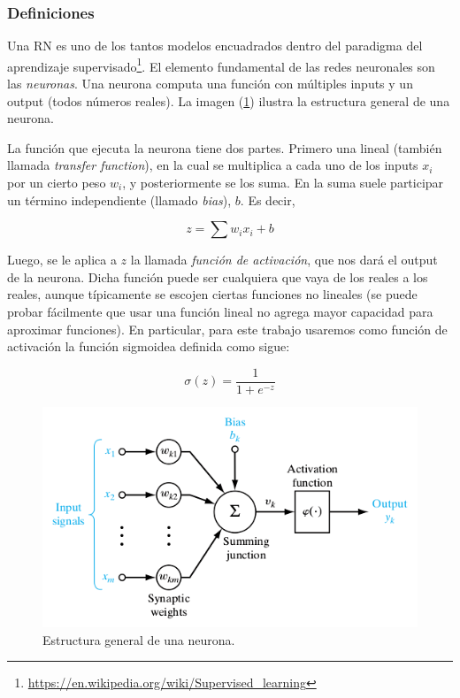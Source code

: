 \subsubsection{Definiciones}

Una RN es uno de los tantos modelos encuadrados dentro del paradigma del aprendizaje supervisado\footnote{\url{https://en.wikipedia.org/wiki/Supervised_learning}}. El elemento fundamental de las redes neuronales son las \emph{neuronas}. Una neurona computa una función con múltiples inputs y un output (todos números reales). La imagen (\ref{fig:neurona}) ilustra la estructura general de una neurona.

La función que ejecuta la neurona tiene dos partes. Primero una lineal (también llamada \emph{transfer function}), en la cual se multiplica a cada uno de los inputs $x_i$ por un cierto peso $w_i$, y posteriormente se los suma. En la suma suele participar un término independiente (llamado \emph{bias}), $b$. Es decir,

$$z = \sum w_i x_i + b$$

Luego, se le aplica a $z$ la llamada \emph{función de activación}, que nos dará el output de la neurona. Dicha función puede ser cualquiera que vaya de los reales a los reales, aunque típicamente se escojen ciertas funciones no lineales (se puede probar fácilmente que usar una función lineal no agrega mayor capacidad para aproximar funciones). En particular, para este trabajo usaremos como función de activación la función sigmoidea definida como sigue:

$$\sigma(z) = \frac{1}{1 + e^{-z}}$$

\begin{figure}[H]
  \begin{center}  
    \includegraphics[width=0.8\linewidth]{imgs/neuron.png}
  \end{center}
  \caption{Estructura general de una neurona. }
  \label{fig:neurona}
\end{figure}

